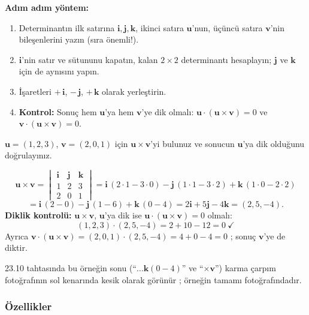 \textbf{Adım adım yöntem:}
\begin{enumerate}
\item Determinantın ilk satırına $\mathbf i,\mathbf j,\mathbf k$, ikinci satıra $\mathbf u$'nun, üçüncü satıra $\mathbf v$'nin bileşenlerini yazın (sıra önemli!).
\item $\mathbf i$'nin satır ve sütununu kapatın, kalan $2\times2$ determinantı hesaplayın; $\mathbf j$ ve $\mathbf k$ için de aynısını yapın.
\item İşaretleri $+\,\mathbf i$, $-\,\mathbf j$, $+\,\mathbf k$ olarak yerleştirin.
\item \textbf{Kontrol:} Sonuç hem $\mathbf u$'ya hem $\mathbf v$'ye dik olmalı: $\mathbf u\cdot(\mathbf u\times\mathbf v)=0$ ve $\mathbf v\cdot(\mathbf u\times\mathbf v)=0$.
\end{enumerate}

\begin{soru}
$\mathbf u=(1,2,3)$, $\mathbf v=(2,0,1)$ için $\mathbf u\times\mathbf v$'yi bulunuz ve sonucun $\mathbf u$'ya dik olduğunu doğrulayınız.
\end{soru}
\begin{cevap}
\[
\mathbf u\times\mathbf v=\begin{vmatrix}\mathbf i&\mathbf j&\mathbf k\\1&2&3\\2&0&1\end{vmatrix}
=\mathbf i\,(2\cdot1-3\cdot0)-\mathbf j\,(1\cdot1-3\cdot2)+\mathbf k\,(1\cdot0-2\cdot2)
\]
\[
=\mathbf i\,(2-0)-\mathbf j\,(1-6)+\mathbf k\,(0-4)=2\mathbf i+5\mathbf j-4\mathbf k=\boxed{(2,5,-4)} .
\]
\textbf{Diklik kontrolü:} $\mathbf u\times\mathbf v$, $\mathbf u$'ya dik ise $\mathbf u\cdot(\mathbf u\times\mathbf v)=0$ olmalı:
\[
(1,2,3)\cdot(2,5,-4)=2+10-12=0 \ \checkmark
\]
Ayrıca $\mathbf v\cdot(\mathbf u\times\mathbf v)=(2,0,1)\cdot(2,5,-4)=4+0-4=0$ \checkmark; sonuç $\mathbf v$'ye de diktir.
\end{cevap}

\begin{bilgi}
23.10 tahtasında bu örneğin sonu (``$\ldots\mathbf k(0-4)$'' ve ``$\times\mathbf v$'') karma çarpım fotoğrafının sol kenarında kesik olarak görünür ; örneğin tamamı  fotoğrafındadır.
\end{bilgi}

\subsubsection{Özellikler}

